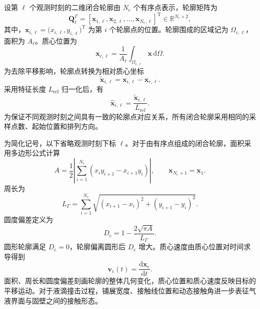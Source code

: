 设第 $\ell$ 个观测时刻的二维闭合轮廓由 $N_{\mathrm c}$ 个有序点表示，轮廓矩阵为
\begin{equation}
\boldsymbol{Q}_{\ell}^{\Gamma}
=
\left[
\boldsymbol{x}_{1,\ell},
\boldsymbol{x}_{2,\ell},
\ldots,
\boldsymbol{x}_{N_{\mathrm c},\ell}
\right]^{\mathrm T}
\in
\mathbb{R}^{N_{\mathrm c}\times2},
\label{eq:ch2_contour_matrix}
\end{equation}
其中，$\boldsymbol{x}_{i,\ell}=\bigl(x_{i,\ell},y_{i,\ell}\bigr)^{\mathrm T}$ 为第 $i$ 个轮廓点的位置。轮廓围成的区域记为 $\Omega_{\mathrm c,\ell}$，面积为 $A_{\ell}$。质心位置为
\begin{equation}
\boldsymbol{x}_{\mathrm c,\ell}
=
\frac{1}{A_{\ell}}
\int_{\Omega_{\mathrm c,\ell}}
\boldsymbol{x}\,\mathrm d\Omega.
\label{eq:ch2_centroid}
\end{equation}
为去除平移影响，轮廓点转换为相对质心坐标
\begin{equation}
\widetilde{\boldsymbol{x}}_{i,\ell}
=
\boldsymbol{x}_{i,\ell}
-
\boldsymbol{x}_{\mathrm c,\ell}.
\label{eq:ch2_centroid_alignment}
\end{equation}
采用特征长度 $L_{\mathrm{ref}}$ 归一化后，有
\begin{equation}
\widehat{\boldsymbol{x}}_{i,\ell}
=
\frac{\widetilde{\boldsymbol{x}}_{i,\ell}}
{L_{\mathrm{ref}}}.
\label{eq:ch2_contour_normalization}
\end{equation}
为保证不同观测时刻之间具有一致的轮廓点对应关系，所有闭合轮廓采用相同的采样点数、起始位置和排列方向。

为简化记号，以下省略观测时刻下标 $\ell$。对于由有序点组成的闭合轮廓，面积采用多边形公式计算
\begin{equation}
A
=
\frac{1}{2}
\left|
\sum_{i=1}^{N_{\mathrm c}}
\left(
x_i y_{i+1}-x_{i+1}y_i
\right)
\right|,
\qquad
\boldsymbol{x}_{N_{\mathrm c}+1}=\boldsymbol{x}_1.
\label{eq:ch2_polygon_area}
\end{equation}
周长为
\begin{equation}
L_{\Gamma}
=
\sum_{i=1}^{N_{\mathrm c}}
\sqrt{
\left(x_{i+1}-x_i\right)^2
+
\left(y_{i+1}-y_i\right)^2
}.
\label{eq:ch2_polygon_perimeter}
\end{equation}
圆度偏差定义为
\begin{equation}
D_{\mathrm c}
=
1-
\frac{2\sqrt{\pi A}}{L_{\Gamma}}.
\label{eq:ch2_circularity_deviation}
\end{equation}
圆形轮廓满足 $D_{\mathrm c}=0$，轮廓偏离圆形后 $D_{\mathrm c}$ 增大。质心速度由质心位置对时间求导得到
\begin{equation}
\boldsymbol{v}_{\mathrm c}(t)
=
\frac{\mathrm d\boldsymbol{x}_{\mathrm c}}{\mathrm dt}.
\label{eq:ch2_centroid_velocity}
\end{equation}
面积、周长和圆度偏差刻画轮廓的整体几何变化，质心位置和质心速度反映目标的平移运动。对于液滴撞击过程，铺展宽度、接触线位置和动态接触角进一步表征气液界面与固壁之间的接触形态。


